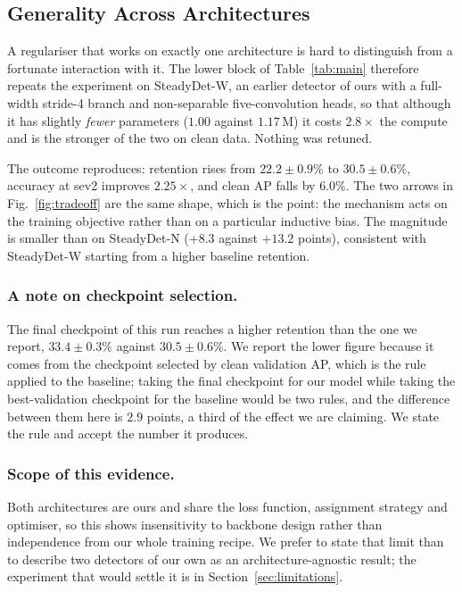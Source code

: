 \subsection{Generality Across Architectures}
\label{sec:generality}

A regulariser that works on exactly one architecture is hard to distinguish from a
fortunate interaction with it. The lower block of Table~\ref{tab:main} therefore
repeats the experiment on SteadyDet-W, an earlier detector of ours with a full-width
stride-4 branch and non-separable five-convolution heads, so that although it has
slightly \emph{fewer} parameters ($1.00$ against $1.17$\,M) it costs $2.8\times$ the
compute and is the stronger of the two on clean data. Nothing was retuned.

The outcome reproduces: retention rises from $22.2 \pm 0.9\%$ to $30.5 \pm 0.6\%$,
accuracy at sev2 improves $2.25\times$, and clean AP falls by $6.0\%$. The two arrows
in Fig.~\ref{fig:tradeoff} are the same shape, which is the point: the mechanism acts
on the training objective rather than on a particular inductive bias. The magnitude is
smaller than on SteadyDet-N ($+8.3$ against $+13.2$ points), consistent with
SteadyDet-W starting from a higher baseline retention.

\subsubsection{A note on checkpoint selection.}
The final checkpoint of this run reaches a higher retention than the one we
report, $33.4 \pm 0.3\%$ against $30.5 \pm 0.6\%$. We report the lower figure
because it comes from the checkpoint selected by clean validation AP, which is the
rule applied to the baseline; taking the final checkpoint for our model while
taking the best-validation checkpoint for the baseline would be two rules, and the
difference between them here is $2.9$ points, a third of the effect we are
claiming. We state the rule and accept the number it produces.

\subsubsection{Scope of this evidence.}
Both architectures are ours and share the loss function, assignment strategy and
optimiser, so this shows insensitivity to backbone design rather than independence
from our whole training recipe. We prefer to state that limit than to describe two
detectors of our own as an architecture-agnostic result; the experiment that would
settle it is in Section~\ref{sec:limitations}.
